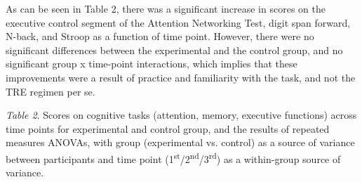 \documentclass[authordate, empirical]{jote-new-article}
\begin{document}
As can be seen in Table 2, there was a significant increase in scores on the executive control segment of the Attention Networking Test, digit span forward, N-back, and Stroop as a function of time point. However, there were no significant differences between the experimental and the control group, and no significant group x time-point interactions, which implies that these improvements were a result of practice and familiarity with the task, and not the TRE regimen per se.



















































\emph{Table 2}. Scores on cognitive tasks (attention, memory, executive functions) across time points for experimental and control group, and the results of repeated measures ANOVAs, with group (experimental vs. control) as a source of variance between participants and time point (1\textsuperscript{st}/2\textsuperscript{nd}/3\textsuperscript{rd}) as a within-group source of variance.
\end{document}
